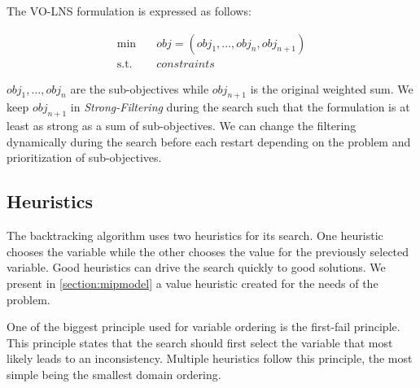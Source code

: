 \documentclass[../../thesis.tex]{subfiles}
\begin{document}
The VO-LNS formulation is expressed as follows:

\begin{align*}
  \text{min} \quad & obj = (obj_1, \dots, obj_n, obj_{n+1}) \\
  \text{s.t.} \quad & constraints 
\end{align*}

$obj_1, \dots, obj_n$ are the sub-objectives while $obj_{n+1}$ is the original weighted sum. We keep $obj_{n+1}$ in 
\emph{Strong-Filtering} during the search such that the formulation is at least as strong as a sum of sub-objectives.
We can change the filtering dynamically during the search before each restart depending on the problem and prioritization of sub-objectives.

\subsection{Heuristics}

The backtracking algorithm uses two heuristics for its search. One heuristic chooses the variable while the other chooses 
the value for the previously selected variable. Good heuristics can drive the search quickly to good solutions. 
We present in \autoref{section:mipmodel} a value heuristic created for the needs of the problem.


One of the biggest principle used for variable ordering is the first-fail principle. 
This principle states that the search should first select the variable that most likely leads to 
an inconsistency. Multiple heuristics follow this principle, the most simple being the smallest domain ordering.
\end{document}
